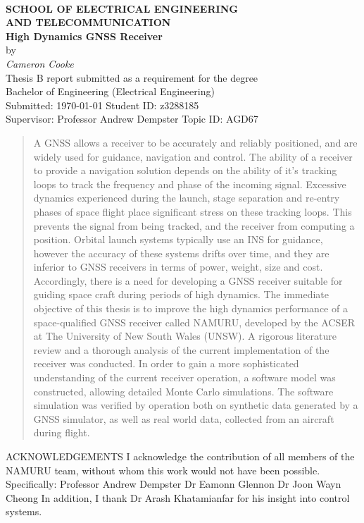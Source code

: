 \begin{center}
\\[0.5cm]
\textbf{\large SCHOOL OF ELECTRICAL ENGINEERING\\
AND TELECOMMUNICATION}\\[2cm]
{\addtolength{\baselineskip}{0.5cm}
\textbf{\Huge
High Dynamics GNSS Receiver}\\[0.5cm]
}
{\Large by}\\[0.5cm]
\textit{\huge
Cameron Cooke} \\[1.5cm]
{\Large
Thesis B report submitted as a requirement for the degree\\
Bachelor of Engineering (Electrical Engineering)\\[2ex]
\vfill
Submitted: \today\hfill
Student ID: z3288185\\[-1.5ex]
Supervisor: Professor Andrew Dempster\hfill
Topic ID: AGD67\\
\vspace*{-1cm}
}
\end{center}


\begin{abstract}
A \ac{GNSS} allows a receiver to be accurately and reliably positioned, and are widely used for guidance, navigation and control.
The ability of a receiver to provide a navigation solution
depends on the ability of it's tracking loops to track the 
frequency and phase of the incoming signal. Excessive dynamics 
experienced during the launch, stage separation and re-entry phases
of space flight place significant stress on these tracking loops. 
This prevents the signal from being tracked, and the receiver from
computing a position. Orbital launch systems typically use an
\ac{INS} for guidance, however the accuracy
of these systems drifts over time, and they are inferior to \ac{GNSS}
receivers in terms of power, weight, size and cost. Accordingly, there is a
need for developing a \ac{GNSS} receiver suitable for guiding 
space craft during periods of high dynamics. The immediate objective of this thesis
is to improve the high dynamics performance of a space-qualified 
\ac{GNSS} receiver called \ac{NAMURU}, developed by the \ac{ACSER} at The University of 
New South Wales (UNSW). A rigorous literature review and a thorough analysis of the current implementation of the receiver was conducted.
In order to gain a more sophisticated understanding of the current receiver operation,
a software model was constructed, allowing detailed Monte Carlo simulations.
The software simulation was verified by operation both on synthetic data generated by a \ac{GNSS}
simulator, as well as real world data, collected from an aircraft during flight.
\end{abstract}


ACKNOWLEDGEMENTS
I acknowledge the contribution of all members of the NAMURU team, without whom this work
would not have been possible. Specifically:
Professor Andrew Dempster
Dr Eamonn Glennon
Dr Joon Wayn Cheong
In addition, I thank Dr Arash Khatamianfar for his insight into control systems.
